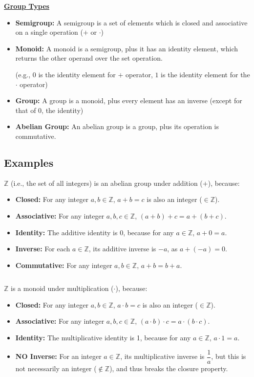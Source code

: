 \begin{tcolorbox}[title={\textbf{\tboxdef{\ref*{subsec:group-def}} Group}}]
$ $

\noindent \textbf{\underline{Group Types}}
\begin{itemize}
\item \textbf{Semigroup:} A semigroup is a set of elements which is closed and associative on a single operation ($+$ or $\cdot$)
\item \textbf{Monoid:} A monoid is a semigroup, plus it has an identity element, which returns the other operand over the set operation.

(e.g., $0$ is the identity element for $+$ operator, $1$ is the identity element for the $\cdot$ operator)
\item \textbf{Group:} A group is a monoid, plus every element has an inverse (except for that of 0, the identity)
\item \textbf{Abelian Group:} An abelian group is a group, plus its operation is commutative.
\end{itemize}
\end{tcolorbox}

\subsection{Examples}
\label{subsec:group-ex}

$\mathbb{Z}$ (i.e., the set of all integers) is an abelian group under addition ($+$), because:
\begin{itemize}
\item \textbf{Closed:} For any integer $a, b \in \mathbb{Z}$, $a + b = c$ is also an integer ($\in \mathbb{Z}$).
\item \textbf{Associative:} For any integer $a, b, c \in \mathbb{Z}$, $(a + b) + c = a + (b + c)$.
\item \textbf{Identity:} The additive identity is 0, because for any $a \in \mathbb{Z}$, $a + 0 = a$.
\item \textbf{Inverse:} For each $a \in \mathbb{Z}$, its additive inverse is $-a$, as $a + (-a) = 0$.
\item \textbf{Commutative: } For any integer $a, b \in \mathbb{Z}$, $a + b = b + a$.
\end{itemize}

$ $

\noindent $\mathbb{Z}$ is a monoid under multiplication ($\cdot$), because:
\begin{itemize}
\item \textbf{Closed:} For any integer $a, b \in \mathbb{Z}$, $a \cdot b = c$ is also an integer ($\in \mathbb{Z}$).
\item \textbf{Associative:} For any integer $a, b, c \in \mathbb{Z}$, $(a \cdot b) \cdot c = a \cdot (b \cdot c)$.
\item \textbf{Identity:} The multiplicative identity is 1, because for any $a \in \mathbb{Z}$, $a \cdot 1 = a$.
\item \textbf{NO Inverse:} For an integer $a \in \mathbb{Z}$, its multiplicative inverse is $\dfrac{1}{a}$, but this is not necessarily an integer ($\not\in \mathbb{Z}$), and thus breaks the closure property.
\end{itemize}
$ $

